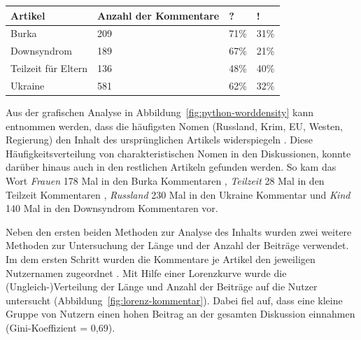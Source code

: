 \documentclass[12pt,a4paper,oneside]{article}
\begin{document}
\begin{titlepage}
\begin{flushleft}
 
\begin{singlespace}
\label{tab:?!-auftritt}
\noindent\begin{tabularx}{.90\textwidth}{l|l|l|l} %
   
    
    
    \hline
    \textbf{Artikel} & \textbf{Anzahl der Kommentare}  & \textbf{?}    & \textbf{!}           \\ \hline 


Burka               & 209                   & 71\%  & 31\%        \\
Downsyndrom         & 189                   & 67\% & 21\%        \\
Teilzeit für Eltern & 136                   & 48\% & 40\%        \\
Ukraine             & 581                   & 62\% & 32\%           \\       
\end{tabularx}
\end{singlespace}

Aus der grafischen Analyse in Abbildung~\ref{fig:python-worddensity} kann entnommen werden, dass die häufigsten Nomen (Russland, Krim, EU, Westen, Regierung) den Inhalt des ursprünglichen Artikels widerspiegeln \cite{Greven2014Zeit}. Diese Häufigkeits\-verteilung von charakteristischen Nomen in den Diskussionen, konnte darüber hinaus auch in den restlichen Artikeln gefunden werden. So kam das Wort \textit{Frauen} 178 Mal in den Burka Kommentaren \cite{Sadigh2014Zeit}, \textit{Teilzeit} 28 Mal in den Teilzeit Kommentaren \cite{Zeit-2-2014Zeit}, \textit{Russland} 230 Mal in den Ukraine Kommentar \cite{Greven2014Zeit} und \textit{Kind} 140 Mal in den Downsyndrom Kommentaren \cite{Wezel2014Zeit} vor.

Neben den ersten beiden Methoden zur Analyse des Inhalts wurden zwei weitere Methoden zur Untersuchung der Länge und der Anzahl der Beiträge verwendet. Im dem ersten Schritt wurden die Kommentare je Artikel den jeweiligen Nutzernamen zugeordnet \cite{Greven2014Zeit}. Mit Hilfe einer Lorenzkurve wurde die (Ungleich-)Verteilung der Länge und Anzahl der Beiträge auf die Nutzer untersucht (Abbildung~\ref{fig:lorenz-kommentar}). Dabei fiel auf, dass eine kleine Gruppe von Nutzern einen hohen Beitrag an der gesamten Diskussion einnahmen (Gini-Koeffizient = 0,69). 

\end{flushleft}
\end{titlepage}
\end{document}
